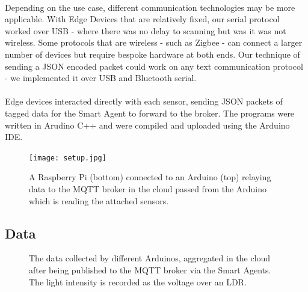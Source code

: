 \paragraph{}
Depending on the use case, different communication technologies may be more applicable. With Edge Devices that are relatively fixed, our serial protocol worked over USB - where there was no delay to scanning but was it was not wireless. Some protocols that are wireless - such as Zigbee - can connect a larger number of devices but require bespoke hardware at both ends. Our technique of sending a JSON encoded packet could work on any text communication protocol - we implemented it over USB and Bluetooth serial.

\paragraph{}
Edge devices interacted directly with each sensor, sending JSON packets of tagged data for the Smart Agent to forward to the broker. The programs were written in Arudino C++ and were compiled and uploaded using the Arduino IDE.


\begin{figure}
    \centering
    \texttt{[image: setup.jpg]}
    \caption{A Raspberry Pi (bottom) connected to an Arduino (top) relaying data to the MQTT broker in the cloud passed from the Arduino which is reading the attached sensors.}
    \label{fig:setup}
\end{figure}


\subsection{Data}

\begin{figure}
    \centering
    \caption{The data collected by different Arduinos, aggregated in the cloud after being published to the MQTT broker via the Smart Agents. The light intensity is recorded as the voltage over an LDR.}
    \label{fig:graph}
\end{figure}

